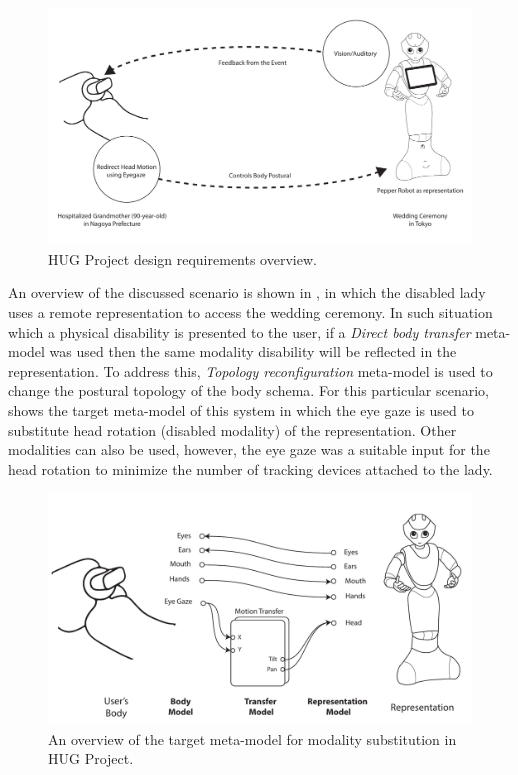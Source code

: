\begin{figure}[h!]
  \centering
	  \includegraphics[width=1\linewidth]{figures/eval/HUG/Overview.pdf}
  \captionsetup{justification=centering}
  \caption{HUG Project design requirements overview.}
  \label{fig:usability-hug-overview}
\end{figure}

An overview of the discussed scenario is shown in , in which the disabled lady uses a remote representation to access the wedding ceremony. In such situation which a physical disability is presented to the user, if a \textit{Direct body transfer} meta-model was used then the same modality disability will be reflected in the representation. To address this, \textit{Topology reconfiguration} meta-model is used to change the postural topology of the body schema. For this particular scenario,  shows the target meta-model of this system in which the eye gaze is used to substitute head rotation (disabled modality) of the representation. Other modalities can also be used, however, the eye gaze was a suitable input for the head rotation to minimize the number of tracking devices attached to the lady.


\begin{figure}[t!]
  \centering
  \includegraphics[width=0.95\linewidth]{figures/eval/EDD/EDD-HUG.pdf}
  \captionsetup{justification=centering}
  \caption{An overview of the target meta-model for modality substitution in HUG Project.}
  \label{fig:concept-EDD-HUG}
\end{figure}

